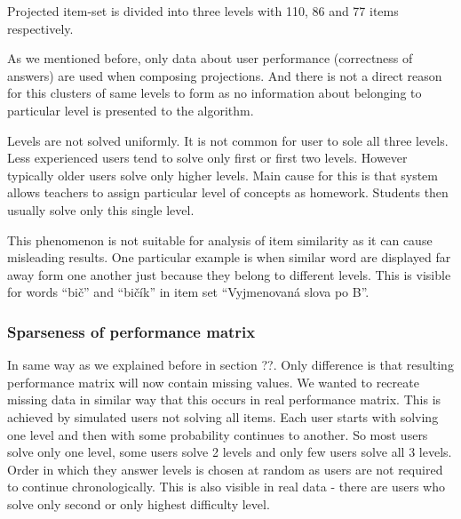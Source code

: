 \documentclass[
  digital, %
  table,   %
  nolof,     %
  nolot,     %
  nocover
]{fithesis3}
\begin{document}
Projected item-set is divided into three levels with 110, 86 and 77 items respectively.

As we mentioned before, only data about user performance (correctness of
answers) are used when composing projections. And there is not a direct
reason for this clusters of same levels to form as no information about
belonging to particular level is presented to the algorithm.


Levels are not solved uniformly. It is not common for user to sole all
three levels. Less experienced users tend to solve only first or first
two levels. However typically older users solve only higher levels. Main
cause for this is that system allows teachers to assign particular level
of concepts as homework. Students then usually solve only this single
level.



This phenomenon is not suitable for analysis of item similarity as it
can cause misleading results. One particular example is when similar
word are displayed far away form one another just because they belong to
different levels. This is visible for words ``bič'' and ``bičík'' in
item set ``Vyjmenovaná slova po B''.

\subsubsection{Sparseness of performance
matrix}\label{sparseness-of-performance-matrix}



In same way as we explained before in section ??. Only difference is that resulting performance matrix will now contain missing values. We wanted to recreate missing data in similar way that this occurs in real performance matrix. This is achieved by simulated users not solving all items. Each user starts with solving one level and then with some probability continues to another. So most users solve only one level, some users solve 2 levels and only few users solve all 3 levels. Order in which they answer levels is chosen at random as users are not required to continue chronologically. This is also visible in real data - there are users who solve only second or only highest difficulty level.
\end{document}
